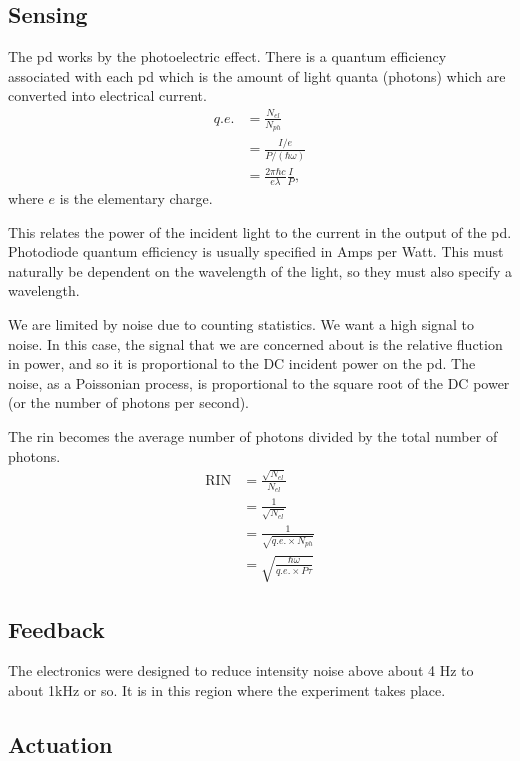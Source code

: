 \subsection{Sensing}

The \ac{pd} works by the photoelectric effect. There is a quantum
efficiency associated with each \ac{pd} which is the amount of light quanta
(photons) which are converted into electrical current.
\begin{align}
q.e. &= \frac{N_{el}}{N_{ph}} \\
     &= \frac{I/e}{P/(\hbar \omega)} \\
     &= \frac{2 \pi \hbar c}{e \lambda} \frac{I}{P} ,
\end{align}
where $e$ is the elementary charge.

This relates the
power of the incident light to the current in the output of the \ac{pd}.
Photodiode quantum efficiency is usually specified in Amps per Watt.
This must naturally be dependent on the wavelength of the light, so they must
also specify a wavelength.

We are limited by noise due to counting statistics. We want a high signal
to noise. In this case, the signal that we are concerned about is the
relative fluction in power, and so it is proportional to the DC incident
power on the \ac{pd}. The noise, as a Poissonian process, is proportional
to the square root of the DC power (or the number of photons per second).

The \ac{rin} becomes the average number of photons divided by the total number
of photons.
\begin{align}
\mathrm{RIN} &= \frac{\sqrt{N_{el}}}{N_{el}} \\
     &= \frac{1}{\sqrt{N_{el}}} \\
     &= \frac{1}{\sqrt{q.e. \times N_{ph}}} \\
     &= \sqrt{\frac{\hbar \omega}{q.e. \times P \tau}}
\end{align}

\subsection{Feedback}

The electronics were designed to reduce intensity noise above about 4 Hz to
about 1kHz or so. It is in this region where the experiment takes place.

\subsection{Actuation}

